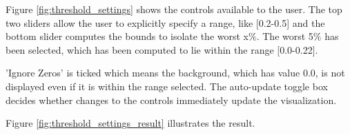Figure \ref{fig:threshold_settings} shows the controls available to the user. The top two sliders allow the user to explicitly specify a range, like [0.2-0.5] and the bottom slider computes the bounds to isolate the worst x$\%$. The worst 5$\%$ has been selected, which has been computed to lie within the range [0.0-0.22].

'Ignore Zeros' is ticked which means the background, which has value 0.0, is not displayed even if it is within the range selected. The auto-update toggle box decides whether changes to the controls immediately update the visualization.

Figure \ref{fig:threshold_settings_result} illustrates the result.\\\\\\

